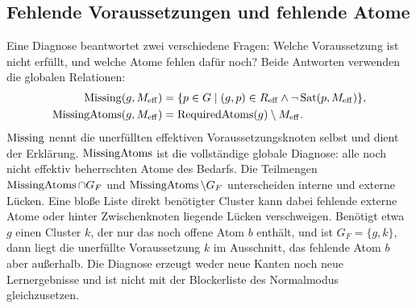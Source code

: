 \subsection{Fehlende Voraussetzungen und fehlende Atome}
Eine Diagnose beantwortet zwei verschiedene Fragen: Welche Voraussetzung
ist nicht erfüllt, und welche Atome fehlen dafür noch? Beide Antworten
verwenden die globalen Relationen:
\begin{align*}
 \operatorname{Missing}(g,M_{\mathrm{eff}})&=\{p\in G\mid(g,p)\in R_{\mathrm{eff}}\land\neg\operatorname{Sat}(p,M_{\mathrm{eff}})\},\\
 \operatorname{MissingAtoms}(g,M_{\mathrm{eff}})&=\operatorname{RequiredAtoms}(g)\setminus M_{\mathrm{eff}}.
\end{align*}
$\operatorname{Missing}$ nennt die unerfüllten effektiven Voraussetzungsknoten selbst und
dient der Erklärung. $\operatorname{MissingAtoms}$ ist die vollständige globale Diagnose:
alle noch nicht effektiv beherrschten Atome des Bedarfs.
Die Teilmengen $\operatorname{MissingAtoms}\cap G_F$ und
$\operatorname{MissingAtoms}\setminus G_F$ unterscheiden interne und externe Lücken.
Eine bloße Liste direkt benötigter Cluster kann dabei fehlende externe
Atome oder hinter Zwischenknoten liegende Lücken verschweigen.
Benötigt etwa $g$ einen Cluster $k$, der nur das noch offene Atom $b$
enthält, und ist $G_F=\{g,k\}$, dann liegt die unerfüllte Voraussetzung $k$
im Ausschnitt, das fehlende Atom $b$ aber außerhalb.
Die Diagnose erzeugt weder neue Kanten noch neue Lernergebnisse und
ist nicht mit der Blockerliste des Normalmodus gleichzusetzen.

